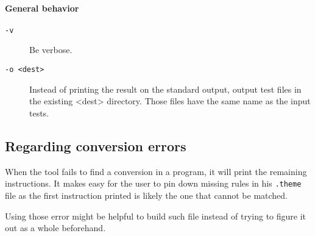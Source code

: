 \paragraph{General behavior}
\begin{description}
\item[{\tt -v}] Be verbose.
\item[{\tt -o <dest>}] Instead of printing the result on the standard output,
output test files in the existing <dest> directory. Those files have the same
name as the input tests.
\end{description}

\subsection{Regarding conversion errors}
When the tool fails to find a conversion in a program, it will print the remaining instructions.
It makes easy for the user to pin down missing rules in his \verb+.theme+ file
as the first instruction printed is likely the one that cannot be matched.

Using those error might be helpful to build such file instead of trying to figure it out
as a whole beforehand.

